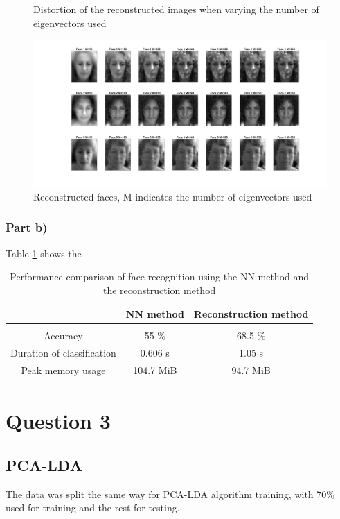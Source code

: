 \documentclass[10pt,technote]{IEEEtran}
\begin{document}
\begin{figure}[htb!]
\begin{subfigure}[b]{\linewidth}
        \quad
    \end{subfigure}
    \caption{Distortion of the reconstructed images when varying the number of eigenvectors used}
    \label{fig:distortion}
\end{figure}
\begin{figure}[htb!]
    \centering
    \includegraphics[width=\linewidth]{../results/ex1aa/face_plots.png}
    \caption{Reconstructed faces, M indicates the number of eigenvectors used}
    \label{fig:reconstr_faces}
\end{figure}

\subsubsection{Part b)}
Table \ref{tab:NNvsRec} shows the 

\begin{table}[]
    \centering
    \begin{tabular}{c||c c}
         & NN method & Reconstruction method  \\\hline \hline\\
         Accuracy &  55 \% & 68.5 \% \\
         Duration of classification & 0.606 s & 1.05 s \\
         Peak memory usage & 104.7 MiB & 94.7 MiB
         
    \end{tabular}
    \caption{Performance comparison of face recognition using the NN method and the reconstruction method}
    \label{tab:NNvsRec}
\end{table}

\section{Question 3}
\subsection{PCA-LDA}
The data was split the same way for PCA-LDA algorithm training, with 70\% used for training and the rest for testing.
\end{document}
